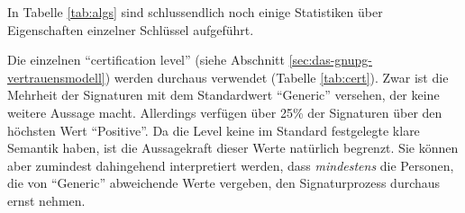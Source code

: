 \begin{table}[ht!]
  \footnotesize
  \centering
  \quad
  \quad
  \caption{Verwendung von Hashalgorithmen 
    , Public-Key-Algorithmen  und
    certification levels  in der grössten starken
    Zusammenhangskomponente}
\end{table}

In Tabelle \ref{tab:algs} sind schlussendlich noch einige Statistiken
über Eigenschaften einzelner Schlüssel aufgeführt. 

Die einzelnen "`certification level"' (siehe Abschnitt
\ref{sec:das-gnupg-vertrauensmodell}) werden durchaus verwendet
(Tabelle \ref{tab:cert}). Zwar ist die Mehrheit der Signaturen mit
dem Standardwert "`Generic"' versehen, der keine weitere Aussage
macht. Allerdings verfügen über 25\% der Signaturen über den
höchsten Wert "`Positive"'. Da die Level keine im Standard
festgelegte klare Semantik haben, ist die Aussagekraft dieser Werte
natürlich begrenzt. Sie können aber zumindest dahingehend
interpretiert werden, dass \emph{mindestens} die Personen, die von
"`Generic"' abweichende Werte vergeben, den Signaturprozess durchaus
ernst nehmen.

